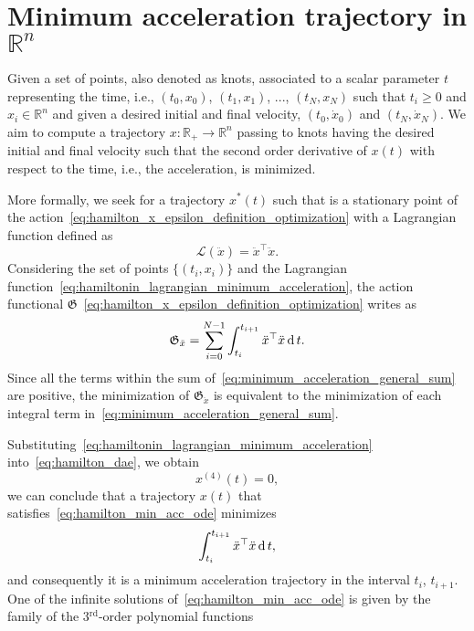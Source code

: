 \section{Minimum acceleration trajectory in $\mathbb{R}^n$\label{appendix:min_acc}}
Given a set of points, also denoted as knots, associated to a scalar parameter $t$ representing the time, i.e., $(t_0, x_0)$, $(t_1, x_1)$, ..., $(t_N, x_N)$ such that $t_i \ge 0$ and $x_i  \in \mathbb{R}^n$ and given a desired initial and final velocity, $(t_0, \dot{x}_0)$ and $(t_N, \dot{x}_N)$. We aim to compute a trajectory $x : \mathbb{R}_+ \rightarrow \mathbb{R}^n$ passing to knots having the desired initial and final velocity such that the second order derivative of $x(t)$ with respect to the time, i.e., the acceleration, is minimized.
\par
More formally, we seek for a trajectory $x^*(t)$ such that is a stationary point of the action~\eqref{eq:hamilton_x_epsilon_definition_optimization} with a Lagrangian function defined as
\begin{equation}
    \label{eq:hamiltonin_lagrangian_minimum_acceleration}
    \mathcal{L}(\ddot{x}) = \ddot{x}^\top \ddot{x}.
\end{equation}
Considering the set of points $\{(t_i, x_i)\}$ and the Lagrangian function~\eqref{eq:hamiltonin_lagrangian_minimum_acceleration}, the action functional $\mathfrak{G}$~\eqref{eq:hamilton_x_epsilon_definition_optimization} writes as
\begin{equation}
    \label{eq:minimum_acceleration_general_sum}
    \mathfrak{G}_{\ddot{x}} = \sum^{N-1}_{i = 0}\int_{t_{i}}^{t_{i+1}} \ddot{x}^\top \ddot{x} \operatorname{d} t.
\end{equation}
Since all the terms within the sum of~\eqref{eq:minimum_acceleration_general_sum} are positive, the minimization of $\mathfrak{G}_{\ddot{x}}$ is equivalent to the minimization of each integral term in~\eqref{eq:minimum_acceleration_general_sum}.
\par
Substituting~\eqref{eq:hamiltonin_lagrangian_minimum_acceleration} into~\eqref{eq:hamilton_dae}, we obtain
\begin{equation}
    \label{eq:hamilton_min_acc_ode}
    x^{(4)}(t) = 0,
\end{equation}
we can conclude that a trajectory $x(t)$ that satisfies~\eqref{eq:hamilton_min_acc_ode} minimizes
\begin{equation}
    \int_{t_{i}}^{t_{i+1}} \ddot{x}^\top \ddot{x} \operatorname{d} t,
\end{equation}
and consequently it is a minimum acceleration trajectory in the interval $t_{i}$, $t_{i+1}$. One of the infinite solutions of~\eqref{eq:hamilton_min_acc_ode} is given by the family of the 3$^{\text{rd}}$-order polynomial functions
